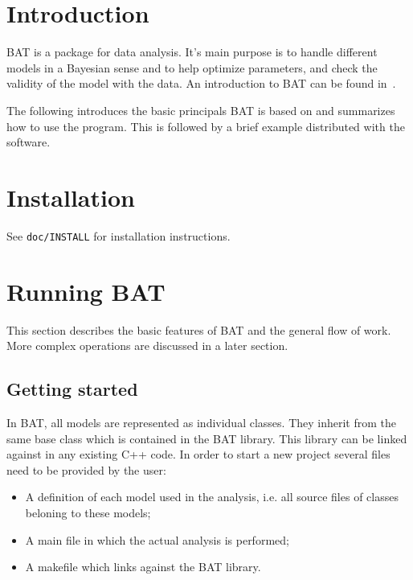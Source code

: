 \documentclass[11pt, a4paper]{article}
\begin{document}
\section{Introduction}
\label{section:introduction}

{\sc BAT} is a package for data analysis. It's main purpose is to
handle different models in a Bayesian sense and to help optimize
parameters, and check the validity of the model with the data. An
introduction to {\sc BAT} can be found in~\cite{Caldwell:2008fw}.

The following introduces the basic principals {\sc BAT} is based on
and summarizes how to use the program. This is followed by a brief
example distributed with the software.

\section{Installation}
\label{section:installation}

See \verb|doc/INSTALL| for installation instructions.

\section{Running BAT}
\label{section:runningBAT}

This section describes the basic features of {\sc BAT} and the general
flow of work. More complex operations are discussed in a later
section.

\subsection{Getting started}

In {\sc BAT}, all models are represented as individual classes. They
inherit from the same base class which is contained in the {\sc BAT}
library. This library can be linked against in any existing C++
code. In order to start a new project several files need to be
provided by the user:
%
\begin{itemize}
\item A definition of each model used in the analysis, i.e. all source
  files of classes beloning to these models;
\item A main file in which the actual analysis is performed;
\item A makefile which links against the {\sc BAT} library.
\end{itemize}
\end{document}
